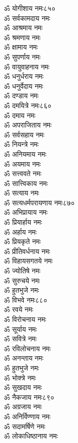 \begin{multicols}{2}
\begin{flushleft}
ॐ योगीशाय नमः\hfill ८५०\\
ॐ सर्वकामदाय नमः\\
ॐ आश्रमाय नमः\\
ॐ श्रमणाय नमः\\
ॐ क्षामाय नमः\\
ॐ सुपर्णाय नमः\\
ॐ वायुवाहनाय नमः\\
ॐ धनुर्धराय नमः\\
ॐ धनुर्वेदाय नमः\\
ॐ दण्डाय नमः\\
ॐ दमयित्रे नमः\hfill ८६०\\
ॐ दमाय नमः\\
ॐ अपराजिताय नमः\\
ॐ सर्वसहाय नमः\\
ॐ नियन्त्रे नमः\\
ॐ अनियमाय नमः\\
ॐ अयमाय नमः\\
ॐ सत्त्ववते नमः\\
ॐ सात्त्विकाय नमः\\
ॐ सत्याय नमः\\
ॐ सत्यधर्मपरायणाय नमः\hfill ८७०\\
ॐ अभिप्रायाय नमः\\
ॐ प्रियार्हाय नमः\\
ॐ अर्हाय नमः\\
ॐ प्रियकृते नमः\\
ॐ प्रीतिवर्धनाय नमः\\
ॐ विहायसगतये नमः\\
ॐ ज्योतिषे नमः\\
ॐ सुरुचये नमः\\
ॐ हुतभुजे नमः\\
ॐ विभवे नमः\hfill ८८०\\
ॐ रवये नमः\\
ॐ विरोचनाय नमः\\
ॐ सूर्याय नमः\\
ॐ सवित्रे नमः\\
ॐ रविलोचनाय नमः\\
ॐ अनन्ताय नमः\\
ॐ हुतभुजे नमः\\
ॐ भोक्त्रे नमः\\
ॐ सुखदाय नमः\\
ॐ नैकजाय नमः\hfill ८९०\\
ॐ अग्रजाय नमः\\
ॐ अनिर्विण्णाय नमः\\
ॐ सदामर्षिणे नमः\\
ॐ लोकाधिष्ठानाय नमः\\

\end{flushleft}
\end{multicols}
